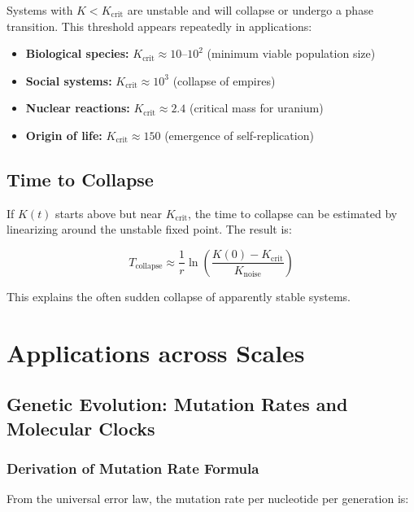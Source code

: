 \documentclass[12pt,a4paper]{article}
\theoremstyle{remark}
\newcommand{\Keffcrit}{K_{\mathrm{crit}}}
\begin{document}
	Systems with $K < \Keffcrit$ are unstable and will collapse or undergo a phase transition. This threshold appears repeatedly in applications:
	
	\begin{itemize}
		\item \textbf{Biological species:} $\Keffcrit \approx 10$--$10^2$ (minimum viable population size)
		\item \textbf{Social systems:} $\Keffcrit \approx 10^3$ (collapse of empires)
		\item \textbf{Nuclear reactions:} $\Keffcrit \approx 2.4$ (critical mass for uranium)
		\item \textbf{Origin of life:} $\Keffcrit \approx 150$ (emergence of self-replication)
	\end{itemize}
	
	\subsection{Time to Collapse}
	
	If $K(t)$ starts above but near $\Keffcrit$, the time to collapse can be estimated by linearizing around the unstable fixed point. The result is:
	
	\begin{equation}
		T_{\text{collapse}} \approx \frac{1}{r} \ln\left( \frac{K(0) - \Keffcrit}{K_{\text{noise}}} \right)
		\label{eq:collapse-time}
	\end{equation}
	
	This explains the often sudden collapse of apparently stable systems.
	
	\section{Applications across Scales}
	\label{sec:applications}
	
	\subsection{Genetic Evolution: Mutation Rates and Molecular Clocks}
	\label{subsec:genetic}
	
	\subsubsection{Derivation of Mutation Rate Formula}
	
	From the universal error law, the mutation rate per nucleotide per generation is:
	
\end{document}
